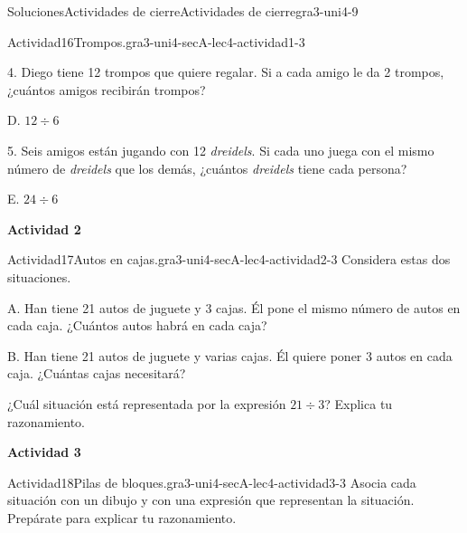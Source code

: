 \documentclass[twoside,10pt,]{article}
\begin{document}
\begin{solutions-section}{Soluciones}{Actividades de cierre}{}{Actividades de cierre}{}{}{gra3-uni4-9}
\begin{activitysolution}{Actividad}{16}{Trompos.}{gra3-uni4-secA-lec4-actividad1-3}
\begin{sidebyside}{2}{0.05}{0}{0.15}
\begin{sbspanel}{0.6}%
4. Diego tiene 12 trompos que quiere regalar. Si a cada amigo le da 2 trompos, ¿cuántos amigos recibirán trompos?%
\end{sbspanel}%
\begin{sbspanel}{0.2}%
\par
D. \(12 \div 6\)%
\end{sbspanel}%
\end{sidebyside}%
\begin{sidebyside}{2}{0.05}{0}{0.15}%
\begin{sbspanel}{0.6}%
5. Seis amigos están jugando con 12 \emph{dreidels}. Si cada uno juega con el mismo número de \emph{dreidels} que los demás, ¿cuántos \emph{dreidels} tiene cada persona?%
\end{sbspanel}%
\begin{sbspanel}{0.2}%
\par
E. \(24 \div 6\)%
\end{sbspanel}%
\end{sidebyside}%
\end{activitysolution}%
\par\medskip
\noindent\textbf{\large{}\space\textperiodcentered\space{}Actividad 2}
\begin{activitysolution}{Actividad}{17}{Autos en cajas.}{gra3-uni4-secA-lec4-actividad2-3}%
Considera estas dos situaciones.%
\begin{sidebyside}{2}{0.05}{0.05}{0.1}%
\begin{sbspanel}{0.4}%
A. Han tiene 21 autos de juguete y 3 cajas. Él pone el mismo número de autos en cada caja. ¿Cuántos autos habrá en cada caja?%
\end{sbspanel}%
\begin{sbspanel}{0.4}%
\par
B. Han tiene 21 autos de juguete y varias cajas. Él quiere poner 3 autos en cada caja. ¿Cuántas cajas necesitará?%
\end{sbspanel}%
\end{sidebyside}%
\par
¿Cuál situación está representada por la expresión \(21\div 3\)? Explica tu razonamiento.%
\end{activitysolution}%
\par\medskip
\noindent\textbf{\large{}\space\textperiodcentered\space{}Actividad 3}
\begin{activitysolution}{Actividad}{18}{Pilas de bloques.}{gra3-uni4-secA-lec4-actividad3-3}%
Asocia cada situación con un dibujo y con una expresión que representan la situación. Prepárate para explicar tu razonamiento.%

\end{activitysolution}
\end{solutions-section}
\end{document}
